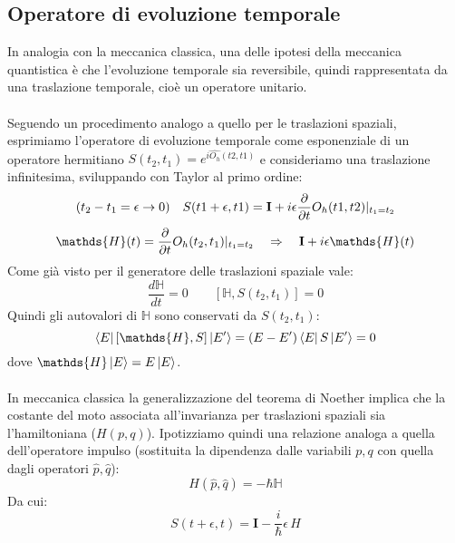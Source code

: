 \documentclass{article}
\begin{document}
\subsection{Operatore di evoluzione temporale}
In analogia con la meccanica classica, una delle ipotesi della meccanica quantistica è che l'evoluzione temporale sia reversibile, quindi rappresentata da una traslazione temporale, cioè un operatore unitario.\\\\
Seguendo un procedimento analogo a quello per le traslazioni spaziali, esprimiamo l'operatore di evoluzione temporale come esponenziale di un operatore hermitiano $S(t_2,t_1)=e^{i\hat{O_h}(t2,t1)}$ e consideriamo una traslazione infinitesima, sviluppando con Taylor al primo ordine:
$$ (t_2-t_1=\epsilon\rightarrow0)\quad S(t1+\epsilon, t1)=\mathbf{I}+i\epsilon\pdv{}{t}O_h(t1,t2)|_{t_1=t_2} $$
$$\mathds{H}(t)=\pdv{}{t}O_h(t_2,t_1)|_{t_1=t_2}\quad\Rightarrow\quad\mathbf{I}+i\epsilon\mathds{H}(t)$$
Come già visto per il generatore delle traslazioni spaziale vale:
$$\frac{d\mathds{H}}{dt}=0\qquad[\mathds{H}, S(t_2,t_1)]=0$$
Quindi gli autovalori di $\mathds{H}$ sono conservati da $S(t_2,t_1)$:
$$ \bra{E}[\mathds{H}, S]\ket{E'}=(E-E')\bra{E}S\ket{E'}=0 $$
dove $\mathds{H}\ket{E}=E\ket{E}$.\\\\
In meccanica classica la generalizzazione del teorema di Noether implica che la costante del moto associata all'invarianza per traslazioni spaziali sia l'hamiltoniana ($H(p, q)$). Ipotizziamo quindi una relazione analoga a quella dell'operatore impulso (sostituita la dipendenza dalle variabili $p,q$ con quella dagli operatori $\hat{p},\hat{q}$):
$$ H(\hat{p},\hat{q})=-\hbar\mathds{H} $$
Da cui:
$$ S(t+\epsilon, t)=\mathbf{I}-\frac{i}{\hbar}\epsilon \,H $$
\end{document}
